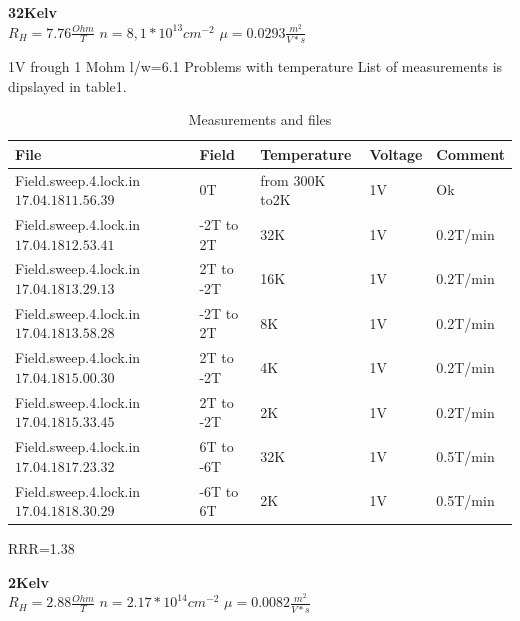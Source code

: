 \documentclass[idxtotoc,hyperref,openany,oneside]{labbook} %
\begin{document}
\normalsize \textbf{32Kelv}\\
$R_H=7.76 \frac{Ohm}{T}$
\newline
$n=8,1*10^{13} cm^{-2}$
\newline
$\mu= 0.0293\frac{m^2}{V*s}$
\newline
\newline


1V frough 1 Mohm l/w=6.1
Problems with temperature
List of measurements is dipslayed in  table1.
 \begin{table}[H]
\begin{tabular}{l l l l l}
\toprule
\textbf{File} & \textbf{Field} & \textbf{Temperature}& \textbf{Voltage}& \textbf{Comment}\\
\toprule
Field.sweep.4.lock.in$17.04.18 11.56.39$& 0T   & from 300K to2K & 1V& Ok\\
Field.sweep.4.lock.in$17.04.18 12.53.41$& -2T to 2T   & 32K & 1V& 0.2T/min\\
Field.sweep.4.lock.in$17.04.18 13.29.13$& 2T to -2T   & 16K & 1V& 0.2T/min\\
Field.sweep.4.lock.in$17.04.18 13.58.28$& -2T to 2T   & 8K & 1V& 0.2T/min\\
Field.sweep.4.lock.in$17.04.18 15.00.30$& 2T to -2T   & 4K & 1V& 0.2T/min\\
Field.sweep.4.lock.in$17.04.18 15.33.45$& 2T to -2T   & 2K & 1V& 0.2T/min\\
Field.sweep.4.lock.in$17.04.18 17.23.32$& 6T to -6T   & 32K & 1V& 0.5T/min\\
Field.sweep.4.lock.in$17.04.18 18.30.29$& -6T to 6T   & 2K & 1V& 0.5T/min\\







\bottomrule
\end{tabular}
\caption{Measurements and files}
\label{tab:Measurements and files}
\end{table}


RRR=1.38
\newline

\normalsize \textbf{2Kelv}\\
$R_H=2.88 \frac{Ohm}{T}$
\newline
$n=2.17*10^{14} cm^{-2}$
\newline
$\mu= 0.0082\frac{m^2}{V*s}$
\newline
\newline
\end{document}
